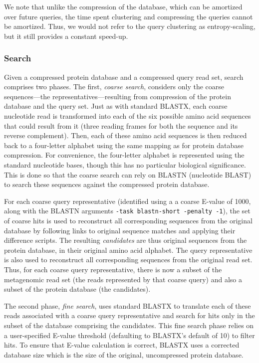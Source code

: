 \documentclass[review,preprint,12pt]{elsarticle}
\theoremstyle{definition}
\theoremstyle{remark}
\begin{document}
We note that unlike the compression of the database, which can be amortized 
over future queries, the time spent clustering and compressing the queries 
cannot be amortized.
Thus, we would not refer to the query clustering as entropy-scaling, but it
still provides a constant speed-up.


\subsubsection{Search}

Given a compressed protein database and a compressed query read set, search
comprises two phases.
The first, \emph{coarse search}, considers only the coarse sequences---the
representatives---resulting from compression of the protein database and the
query set.
Just as with standard BLASTX, each coarse nucleotide read is transformed into 
each of the six possible amino acid sequences that could result from it (three 
reading frames for both the sequence and its reverse complement).
Then, each of these amino acid sequences is then reduced back to a four-letter
alphabet using the same mapping as for protein database compression.
For convenience, the four-letter alphabet is represented using the standard
nucleotide bases, though this has no particular biological significance.
This is done so that the coarse search can rely on BLASTN (nucleotide BLAST) to
search these sequences against the compressed protein database.

For each coarse query representative (identified using a a coarse E-value of 
1000, along with the BLASTN arguments \texttt{-task blastn-short -penalty -1}), 
the set of coarse hits is used to
reconstruct all corresponding sequences from the original database by following
links to original sequence matches and applying their difference scripts.
The resulting \emph{candidates} are thus original sequences from the protein
database, in their original amino acid alphabet.
The query representative is also used to reconstruct all corresponding sequences
from the original read set.
Thus, for each coarse query representative, there is now a subset of the
metagenomic read set (the reads represented by that coarse query) and also a
subset of the protein database (the candidates).

The second phase, \emph{fine search}, uses standard BLASTX to translate each
of these reads associated with a coarse query representative and search for
hits only in the subset of the database comprising the candidates.
This fine search phase relies on a user-specified E-value threshold (defaulting
to BLASTX's default of 10) to filter hits.
To ensure that E-value calculation is correct, BLASTX uses a corrected database
size which is the size of the original, uncompressed protein database.
\end{document}
